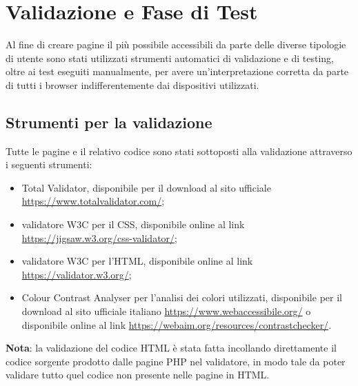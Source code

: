 \section{Validazione e Fase di Test}
Al fine di creare pagine il più possibile accessibili da parte delle diverse tipologie di utente sono stati utilizzati strumenti automatici di validazione e di testing, oltre ai test eseguiti manualmente, per avere un'interpretazione corretta da parte di tutti i browser indifferentemente dai dispositivi utilizzati.

\subsection{Strumenti per la validazione}
Tutte le pagine e il relativo codice sono stati sottoposti alla validazione attraverso i seguenti strumenti:
\begin{itemize}
	\item Total Validator, disponibile per il download al sito ufficiale \url{https://www.totalvalidator.com/};
	\item validatore W3C per il CSS, disponibile online al link \url{https://jigsaw.w3.org/css-validator/};
	\item validatore W3C per l'HTML, disponibile online al link \url{https://validator.w3.org/};
	\item Colour Contrast Analyser per l'analisi dei colori utilizzati, disponibile per il download al sito ufficiale italiano \url{https://www.webaccessibile.org/} o disponibile online al link \url{https://webaim.org/resources/contrastchecker/}.
\end{itemize}
\textbf{Nota}: la validazione del codice HTML è stata fatta incollando direttamente il codice sorgente prodotto dalle pagine PHP nel validatore, in modo tale da poter validare tutto quel codice non presente nelle pagine in HTML.

